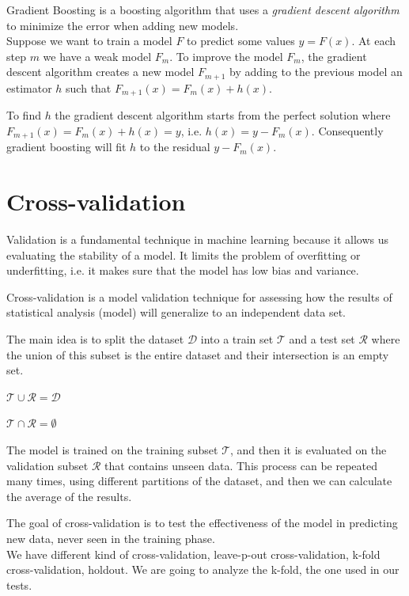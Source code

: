Gradient Boosting is a boosting algorithm that uses a \textit{gradient descent algorithm} to minimize the error when adding new models.\\

Suppose we want to train a model $F$ to predict some values $y = F(x)$. At each step $m$ we have a weak model $F_m$. To improve the model $F_m$, the gradient descent algorithm creates a new model $F_{m+1}$ by adding to the previous model an estimator $h$ such that $F_{m+1}(x) = F_m(x) + h(x)$. \cite{gradientBoostLi}

To find $h$ the gradient descent algorithm starts from the perfect solution where $F_{m+1}(x) = F_m(x) + h(x) = y$, i.e. $h(x) = y - F_m(x)$. Consequently gradient boosting will fit $h$ to the residual $y - F_m(x)$.


\section{Cross-validation}

Validation is a fundamental technique in machine learning because it allows us evaluating the stability of a model. It limits the problem of overfitting or underfitting, i.e. it makes sure that  the model has low bias and variance.

Cross-validation is a model validation technique for assessing how the results of statistical analysis (model) will generalize to an independent data set.

The main idea is to split the dataset $\mathcal{D}$ into a train set $\mathcal{T}$ and a test set $\mathcal{R}$ where the union of this subset is the entire dataset and their intersection is an empty set. \cite{ghojogh2019theory}

 $\mathcal{T} \cup \mathcal{R} = \mathcal{D} $
 
 $\mathcal{T} \cap \mathcal{R} = \emptyset $
 

The model is trained on the training subset $\mathcal{T}$, and then it is evaluated on the validation subset $\mathcal{R}$ that contains unseen data.
This process can be repeated many times, using different partitions of the dataset, and then we can calculate the average of the results.

The goal of cross-validation is to test the effectiveness of the model in predicting new data, never seen in the training phase.\\

We have different kind of cross-validation, leave-p-out cross-validation, k-fold cross-validation, holdout. We are going to analyze the k-fold, the one used in our tests.





